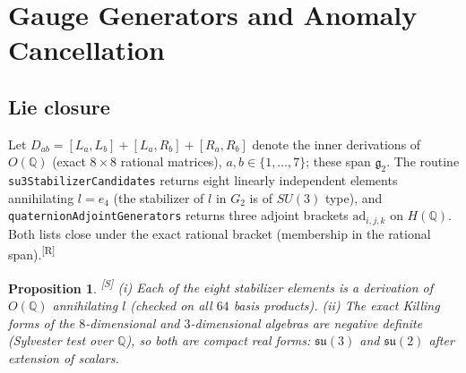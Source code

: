 \documentclass[11pt,a4paper]{article}
\newtheorem{proposition}[theorem]{Proposition}
\theoremstyle{definition}
\theoremstyle{remark}
\newcommand{\Q}{\mathbb{Q}}
\newcommand{\HQ}{H(\mathbb{Q})}
\newcommand{\OQ}{O(\mathbb{Q})}
\newcommand{\code}[1]{\texttt{#1}}
\newcommand{\tR}{\textsuperscript{[R]}}
\newcommand{\tS}{\textsuperscript{[S]}}
\begin{document}
\section{Gauge Generators and Anomaly Cancellation}\label{sec:gauge}
\subsection{Lie closure}
Let $D_{ab}=[L_a,L_b]+[L_a,R_b]+[R_a,R_b]$ denote the inner derivations of $\OQ$ (exact $8\times8$ rational matrices), $a,b\in\{1,\dots,7\}$; these span $\mathfrak{g}_2$. The routine \code{su3StabilizerCandidates} returns eight linearly independent elements annihilating $l=e_4$ (the stabilizer of $l$ in $G_2$ is of $SU(3)$ type), and \code{quaternionAdjointGenerators} returns three adjoint brackets $\mathrm{ad}_{i,j,k}$ on $\HQ$. Both lists close under the exact rational bracket (membership in the rational span).\tR
\begin{proposition}\label{prop:closure}\tS
(i) Each of the eight stabilizer elements is a derivation of $\OQ$ annihilating $l$ (checked on all $64$ basis products). (ii) The exact Killing forms of the $8$-dimensional and $3$-dimensional algebras are negative definite (Sylvester test over $\Q$), so both are compact real forms: $\mathfrak{su}(3)$ and $\mathfrak{su}(2)$ after extension of scalars.
\end{proposition}
\end{document}
